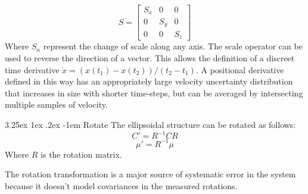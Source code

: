 \documentclass{article}
\makeatletter
\renewcommand\paragraph{\@startsection{paragraph}{5}{\z@}%
  {3.25ex \@plus1ex \@minus.2ex}%
  {-1em}%
  {\normalfont\normalsize\bfseries}}
\makeatother
\begin{document}
        \begin{equation}
        S=\begin{bmatrix}
          S_x & 0 & 0 \\[0.3em]
          0 & S_y & 0 \\[0.3em]
          0 & 0 & S_z
        \end{bmatrix}
        \end{equation}
        Where \(S_n\) represent the change of scale along any axis.
        The scale operator can be used to reverse the direction of a vector.  This allows the definition of a discreet time derivative \(\dot{x} = (x(t_1) - x(t_2))/(t_2-t_1)\).  A positional derivative defined in this way has an appropriately large velocity uncertainty distribution that increases in size with shorter time-steps, but can be averaged by intersecting multiple samples of velocity.

        \paragraph{Rotate}
        The ellipsoidal structure can be rotated as follows:
        \begin{equation}
        C' = R^{-1} C R
        \end{equation}
        \begin{equation}
        \mu' = R^{-1} \mu
        \end{equation}
        Where \(R\) is the rotation matrix.

        The rotation transformation is a major source of systematic error in the system because it doesn't model covariances in the measured rotations. %
\end{document}
